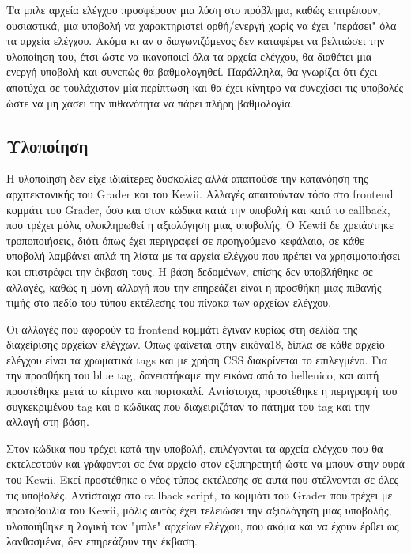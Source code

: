 \documentclass[diploma]{softlab-thesis}
\begin{document}
\bigskip

Τα μπλε αρχεία ελέγχου προσφέρουν μια λύση στο πρόβλημα, καθώς επιτρέπουν,
ουσιαστικά, μια υποβολή να χαρακτηριστεί ορθή/ενεργή χωρίς να έχει "περάσει"
όλα τα αρχεία ελέγχου. Ακόμα κι αν ο διαγωνιζόμενος δεν καταφέρει να βελτιώσει
την υλοποίηση του, έτσι ώστε να ικανοποιεί όλα τα αρχεία ελέγχου, θα διαθέτει
μια ενεργή υποβολή και συνεπώς θα βαθμολογηθεί. Παράλληλα, θα γνωρίζει ότι
έχει αποτύχει σε τουλάχιστον μία περίπτωση και θα έχει κίνητρο να συνεχίσει τις
υποβολές ώστε να μη χάσει την πιθανότητα να πάρει πλήρη βαθμολογία.

\subsection{Υλοποίηση}

Η υλοποίηση δεν είχε ιδιαίτερες δυσκολίες αλλά απαιτούσε την κατανόηση της
αρχιτεκτονικής του Grader και του Kewii. Αλλαγές απαιτούνταν τόσο στο frontend
κομμάτι του Grader, όσο και στον κώδικα κατά την υποβολή και κατά το callback,
που τρέχει μόλις ολοκληρωθεί η αξιολόγηση μιας υποβολής. Ο Kewii δε χρειάστηκε
τροποποιήσεις, διότι όπως έχει περιγραφεί σε προηγούμενο κεφάλαιο, σε κάθε
υποβολή λαμβάνει απλά τη λίστα με τα αρχεία ελέγχου που πρέπει να
χρησιμοποιήσει και επιστρέφει την έκβαση τους. Η βάση δεδομένων, επίσης δεν
υποβλήθηκε σε αλλαγές, καθώς η μόνη αλλαγή που την επηρεάζει είναι η προσθήκη
μιας πιθανής τιμής στο πεδίο του τύπου εκτέλεσης του πίνακα των αρχείων
ελέγχου.

\bigskip

Οι αλλαγές που αφορούν το frontend κομμάτι έγιναν κυρίως στη σελίδα της διαχείρισης
αρχείων ελέγχων. Όπως φαίνεται στην εικόνα18, δίπλα σε κάθε αρχείο ελέγχου είναι
τα χρωματικά tags και με χρήση CSS διακρίνεται το επιλεγμένο. Για την προσθήκη
του blue tag, δανειστήκαμε την εικόνα από το hellenico, και αυτή προστέθηκε μετά
το κίτρινο και πορτοκαλί. Αντίστοιχα, προστέθηκε η περιγραφή του συγκεκριμένου
tag και ο κώδικας που διαχειριζόταν το πάτημα του tag και την αλλαγή στη βάση.

\bigskip

Στον κώδικα που τρέχει κατά την υποβολή, επιλέγονται τα αρχεία ελέγχου που θα
εκτελεστούν και γράφονται σε ένα αρχείο στον εξυπηρετητή ώστε να μπουν στην
ουρά του Kewii. Εκεί προστέθηκε ο νέος τύπος εκτέλεσης σε αυτά που στέλνονται
σε όλες τις υποβολές. Αντίστοιχα στο callback script, το κομμάτι του Grader που
τρέχει με πρωτοβουλία του Kewii, μόλις αυτός έχει τελειώσει την αξιολόγηση μιας
υποβολής, υλοποιήθηκε η λογική των "μπλε" αρχείων ελέγχου, που ακόμα και να
έχουν έρθει ως λανθασμένα, δεν επηρεάζουν την έκβαση.
\end{document}
